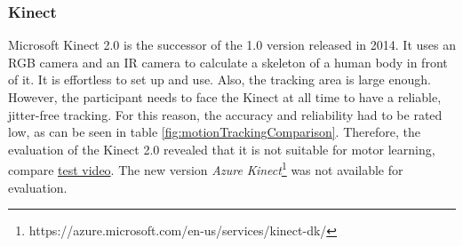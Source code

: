 \subsubsection{Kinect}
Microsoft Kinect 2.0 is the successor of the 1.0 version released in 2014. It uses an RGB camera and an IR camera to calculate a skeleton of a human body in front of it. It is effortless to set up and use. Also, the tracking area is large enough. However, the participant needs to face the Kinect at all time to have a reliable, jitter-free tracking. For this reason, the accuracy  and reliability had to be rated low, as can be seen in table \ref{fig:motionTrackingComparison}. Therefore, the evaluation of the Kinect 2.0 revealed that it is not suitable for motor learning, compare \href{https://youtu.be/3ftKXTBCN0Y}{test video}. The new version \textit{Azure Kinect}\footnote{https://azure.microsoft.com/en-us/services/kinect-dk/} was not available for evaluation. 



